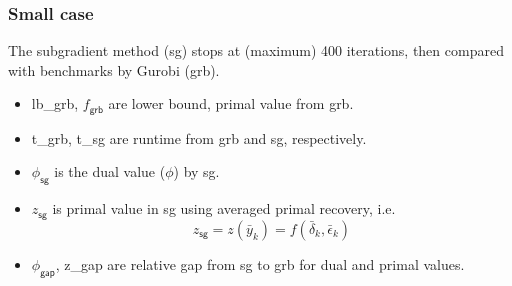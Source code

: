 \begin{frame}
  \frametitle{Small case}

  The subgradient method (sg) stops at (maximum) 400 iterations, then compared with benchmarks by Gurobi (grb).
  \begin{itemize}
    \item lb\_grb, \(f_{\textsf{grb}}\)  are lower bound, primal value from grb.
    \item t\_grb, t\_sg are runtime from grb and sg, respectively.
    \item \(\phi_{\textsf{sg}}\) is the dual value (\(\phi\)) by sg.
    \item \(z_{\textsf{sg}}\) is primal value in sg using averaged primal recovery, i.e.
          \[z_{\textsf{sg}} = z(\bar y_k) = f(\bar \delta_k, \bar \epsilon_k)\]
    \item \(\phi_{\textsf{gap}}\), z\_gap are relative gap from sg to grb for dual and primal values.
  \end{itemize}
\end{frame}

